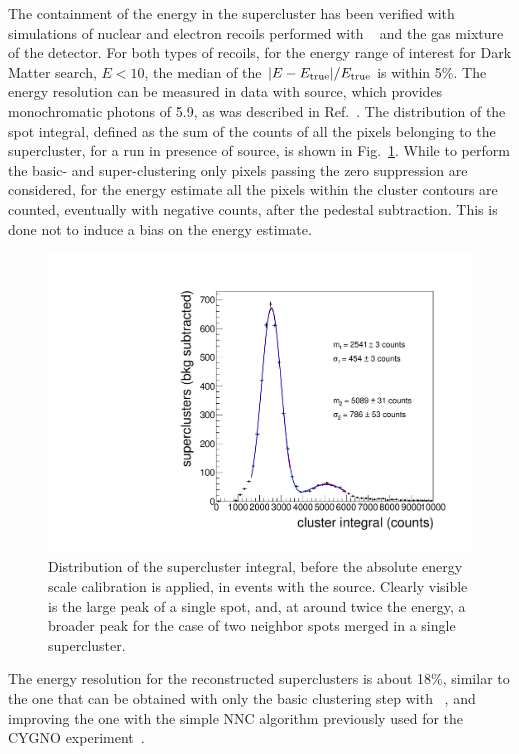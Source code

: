The containment of the energy in the supercluster has been verified
with simulations of nuclear and electron recoils performed with
\GEANTfour~\cite{GEANT4} and the gas mixture of the \lemon detector.
For both types of recoils, for the energy range of interest for Dark
Matter search, \ie $E<10$\keV, the median of the
$\vert E-E_\textrm{true} \vert/E_\textrm{true}$ is within 5\%. The energy
resolution can be measured in data with \fe source, which provides
monochromatic photons of 5.9\keV, as was described in
Ref.~\cite{bib:fe55}. The distribution of the spot integral, defined as
the sum of the counts of all the pixels belonging to the supercluster,
for a run in presence of \fe source, is shown in
Fig.~\ref{fig:feuncalibpeak}. While to perform the basic- and
super-clustering only pixels passing the zero suppression are
considered, for the energy estimate all the pixels within the cluster
contours are counted, eventually with negative counts, after the
pedestal subtraction. This is done not to induce a bias on the energy
estimate.
%
\begin{figure}[ht]
  \begin{center}
    \includegraphics[width=0.49\linewidth]{figures/fe_ucalibintegral_fit}
    \caption{Distribution of the supercluster integral, before the
      absolute energy scale calibration is applied, in events with the
      \fe source. Clearly visible is the large peak of a single spot,
      and, at around twice the energy, a broader peak for the case of
      two neighbor spots merged in a single supercluster.
      \label{fig:feuncalibpeak}}
  \end{center}
\end{figure}
%
The energy resolution for the reconstructed \gac superclusters is
about 18\%, similar to the one that can be obtained with only the
basic clustering step with \idbscan~\cite{iDBSCAN}, and improving the
one with the simple NNC algorithm previously used for the CYGNO
experiment~\cite{bib:fe55}.



